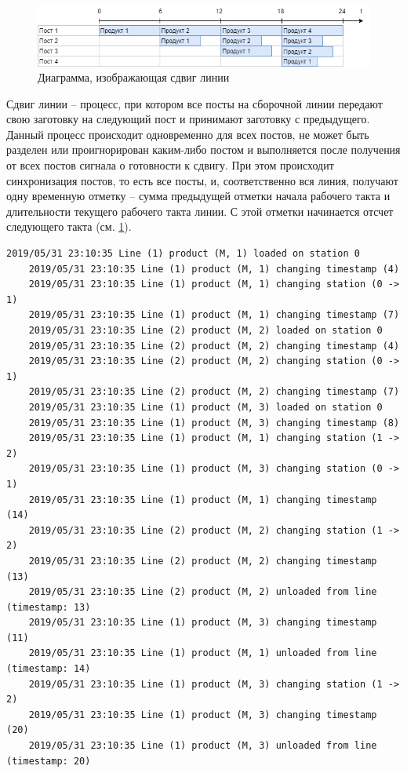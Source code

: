 \begin{figure}[ht]
	\centering
	\includegraphics[width=\linewidth]{pics/assemblyDiagram.png}
	\caption{Диаграмма, изображающая сдвиг линии}
	\label{fig:lineDiagram}
\end{figure}

\indent Сдвиг линии -- процесс, при котором все посты на сборочной линии передают свою заготовку на следующий пост и принимают заготовку с предыдущего.
Данный процесс происходит одновременно для всех постов, не может быть разделен или проигнорирован каким-либо постом и выполняется после получения от всех постов сигнала о готовности к сдвигу.
При этом происходит синхронизация постов, то есть все посты, и, соответственно вся линия, получают одну временную отметку -- сумма предыдущей отметки начала рабочего такта и длительности текущего рабочего такта линии.
С этой отметки начинается отсчет следующего такта (см. \ref{fig:lineDiagram}).


\begin{lstlisting}[caption={Интерфейс ресурса},label={lst:assemblyLog},language=Golang]
	2019/05/31 23:10:35 Line (1) product (M, 1) loaded on station 0
	2019/05/31 23:10:35 Line (1) product (M, 1) changing timestamp (4)
	2019/05/31 23:10:35 Line (1) product (M, 1) changing station (0 -> 1)
	2019/05/31 23:10:35 Line (1) product (M, 1) changing timestamp (7)
	2019/05/31 23:10:35 Line (2) product (M, 2) loaded on station 0
	2019/05/31 23:10:35 Line (2) product (M, 2) changing timestamp (4)
	2019/05/31 23:10:35 Line (2) product (M, 2) changing station (0 -> 1)
	2019/05/31 23:10:35 Line (2) product (M, 2) changing timestamp (7)
	2019/05/31 23:10:35 Line (1) product (M, 3) loaded on station 0
	2019/05/31 23:10:35 Line (1) product (M, 3) changing timestamp (8)
	2019/05/31 23:10:35 Line (1) product (M, 1) changing station (1 -> 2)
	2019/05/31 23:10:35 Line (1) product (M, 3) changing station (0 -> 1)
	2019/05/31 23:10:35 Line (1) product (M, 1) changing timestamp (14)
	2019/05/31 23:10:35 Line (2) product (M, 2) changing station (1 -> 2)
	2019/05/31 23:10:35 Line (2) product (M, 2) changing timestamp (13)
	2019/05/31 23:10:35 Line (2) product (M, 2) unloaded from line (timestamp: 13)
	2019/05/31 23:10:35 Line (1) product (M, 3) changing timestamp (11)
	2019/05/31 23:10:35 Line (1) product (M, 1) unloaded from line (timestamp: 14)
	2019/05/31 23:10:35 Line (1) product (M, 3) changing station (1 -> 2)
	2019/05/31 23:10:35 Line (1) product (M, 3) changing timestamp (20)
	2019/05/31 23:10:35 Line (1) product (M, 3) unloaded from line (timestamp: 20)
\end{lstlisting}

